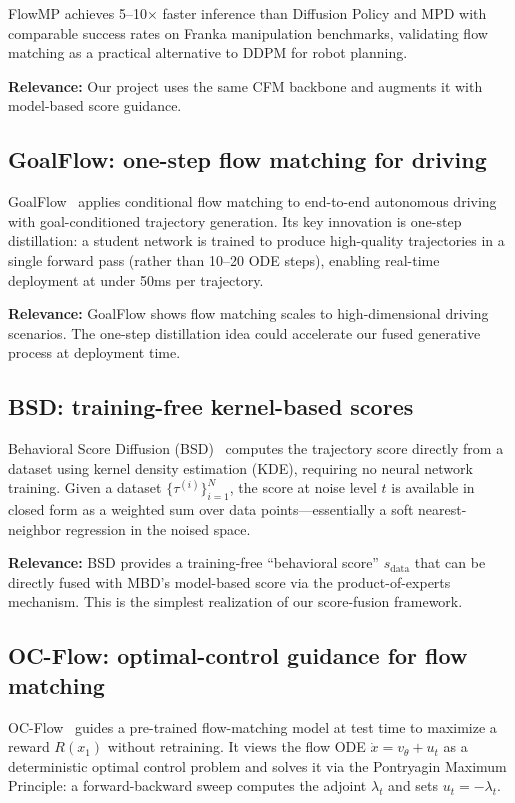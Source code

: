 \documentclass[11pt,letterpaper]{article}
\theoremstyle{plain}
\theoremstyle{definition}
\theoremstyle{remark}
\begin{document}
FlowMP achieves 5--10$\times$ faster inference than Diffusion Policy
and MPD with comparable success rates on Franka manipulation benchmarks,
validating flow matching as a practical alternative to DDPM for robot
planning.

\textbf{Relevance:} Our project uses the same CFM backbone and augments
it with model-based score guidance.

\subsection{GoalFlow: one-step flow matching for driving}

GoalFlow~\citep{xing2025goalflow} applies conditional flow matching to
end-to-end autonomous driving with goal-conditioned trajectory
generation.  Its key innovation is one-step distillation: a student
network is trained to produce high-quality trajectories in a single
forward pass (rather than 10--20 ODE steps), enabling real-time
deployment at under 50ms per trajectory.

\textbf{Relevance:} GoalFlow shows flow matching scales to
high-dimensional driving scenarios.  The one-step distillation idea
could accelerate our fused generative process at deployment time.

\subsection{BSD: training-free kernel-based scores}

Behavioral Score Diffusion (BSD)~\citep{bsd} computes the trajectory
score directly from a dataset using kernel density estimation (KDE),
requiring no neural network training.  Given a dataset
$\{\tau^{(i)}\}_{i=1}^N$, the score at noise level $t$ is available in
closed form as a weighted sum over data points---essentially a soft
nearest-neighbor regression in the noised space.

\textbf{Relevance:} BSD provides a training-free ``behavioral score''
$s_\text{data}$ that can be directly fused with MBD's model-based score
via the product-of-experts mechanism.  This is the simplest realization
of our score-fusion framework.

\subsection{OC-Flow: optimal-control guidance for flow matching}

OC-Flow~\citep{ocflow} guides a pre-trained flow-matching model at
test time to maximize a reward $R(x_1)$ without retraining.  It views
the flow ODE $\dot x=v_\theta+u_t$ as a deterministic optimal control
problem and solves it via the Pontryagin Maximum Principle: a
forward-backward sweep computes the adjoint $\lambda_t$ and sets
$u_t=-\lambda_t$.
\end{document}
